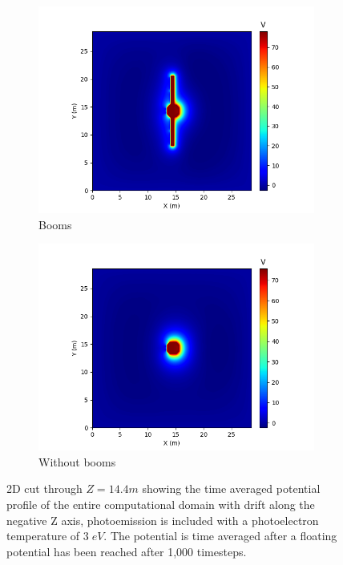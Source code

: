 \begin{figure}[H]
  \begin{subfigure}[b]{0.6\textwidth}
    \includegraphics[width=\textwidth]{figures/MMO/PHTemp/WB/P_PHTemp_WB.png}
    \caption{Booms}
    \label{fig:P_PHTemp_WB}
  \end{subfigure}
  \hfill
  \begin{subfigure}[b]{0.6\textwidth}
    \includegraphics[width=\textwidth]{figures/MMO/PHTemp/NB/P_PHTemp_NB.png}
    \caption{Without booms}
    \label{fig:P_PHTemp_NB}
  \end{subfigure}
  \caption{2D cut through $Z = 14.4 m$ showing the time averaged potential profile of the entire computational domain with drift along the negative Z axis, photoemission is included with a photoelectron temperature of $3 \; eV$. The potential is time averaged after a floating potential has been reached after 1,000 timesteps.}
  \label{fig:Pot_PHTemp}
\end{figure}

